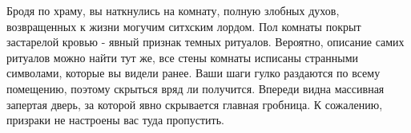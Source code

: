 Бродя по храму, вы наткнулись на комнату, полную злобных духов, возвращенных к жизни могучим ситхским лордом.
Пол комнаты покрыт застарелой кровью - явный признак темных ритуалов. Вероятно, описание самих ритуалов можно найти тут же, все стены комнаты исписаны странными символами, которые вы видели ранее.
Ваши шаги гулко раздаются по всему помещению, поэтому скрыться вряд ли получится.
Впереди видна массивная запертая дверь, за которой явно скрывается главная гробница. К сожалению, призраки не настроены вас туда пропустить.
